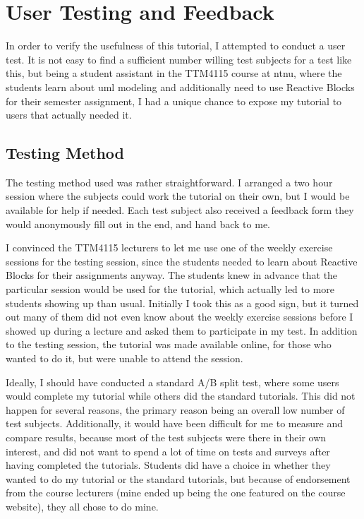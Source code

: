\section{User Testing and Feedback}
\label{sec:tutorial_testing}
In order to verify the usefulness of this tutorial, I attempted to conduct a user test. It is not easy to find a sufficient number willing test subjects for a test like this, but being a student assistant in the TTM4115 course at \gls{ntnu}, where the students learn about \gls{uml} modeling and additionally need to use Reactive Blocks for their semester assignment, I had a unique chance to expose my tutorial to users that actually needed it.

\subsection{Testing Method}
\label{sec:tutorial_testing_method}
The testing method used was rather straightforward. I arranged a two hour session where the subjects could work the tutorial on their own, but I would be available for help if needed. Each test subject also received a feedback form they would anonymously fill out in the end, and hand back to me.

\noindent
I convinced the TTM4115 lecturers to let me use one of the weekly exercise sessions for the testing session, since the students needed to learn about Reactive Blocks for their assignments anyway. The students knew in advance that the particular session would be used for the tutorial, which actually led to more students showing up than usual. Initially I took this as a good sign, but it turned out many of them did not even know about the weekly exercise sessions before I showed up during a lecture and asked them to participate in my test. In addition to the testing session, the tutorial was made available online, for those who wanted to do it, but were unable to attend the session.

\noindent
Ideally, I should have conducted a standard A/B split test, where some users would complete my tutorial while others did the standard tutorials. This did not happen for several reasons, the primary reason being an overall low number of test subjects. Additionally, it would have been difficult for me to measure and compare results, because most of the test subjects were there in their own interest, and did not want to spend a lot of time on tests and surveys after having completed the tutorials. Students did have a choice in whether they wanted to do my tutorial or the standard tutorials, but because of endorsement from the course lecturers (mine ended up being the one featured on the course website), they all chose to do mine.

